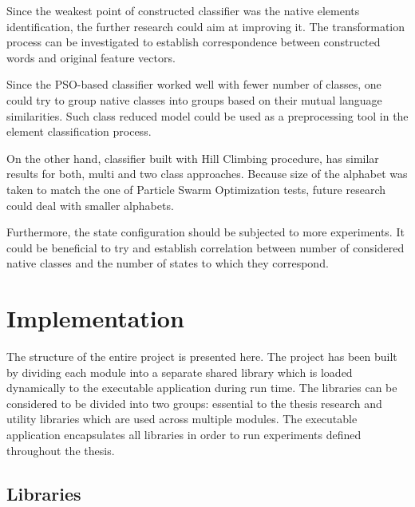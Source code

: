 \documentclass{mini}
\begin{document}
Since the weakest point of constructed classifier was the native elements identification, the further research could aim at improving it. The transformation process can be investigated to establish correspondence between constructed words and original feature vectors.

Since the PSO-based classifier worked well with fewer number of classes, one could try to group native classes into groups based on their mutual language similarities. Such class reduced model could be used as a preprocessing tool in the element classification process. 

On the other hand, classifier built with Hill Climbing procedure, has similar results for both, multi and two class approaches. Because size of the alphabet was taken to match the one of Particle Swarm Optimization tests, future research could deal with smaller alphabets.

Furthermore, the state configuration should be subjected to more experiments.
It could be beneficial to try and establish correlation between number of considered native classes and the number of states to which they correspond.



\appendix\label{appendix_a}

\chapter{Implementation} \label{chap:domain}
The structure of the entire project is presented here.
The project has been built by dividing each module into a separate shared library which is loaded dynamically to the executable application during run time. The libraries can be considered to be divided into two groups: essential to the thesis research and utility libraries which are used across multiple modules. The executable application encapsulates all libraries in order to run experiments defined throughout the thesis.

\section{Libraries}
\end{document}
